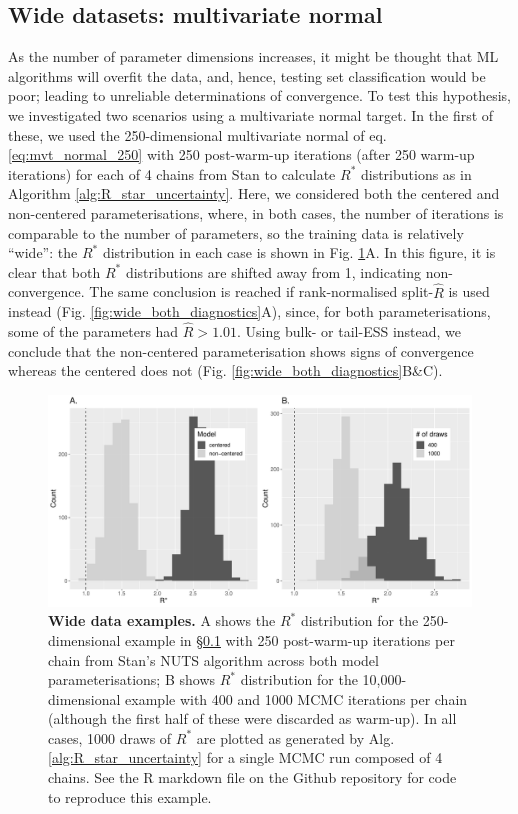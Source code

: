 \documentclass{article}
\begin{document}
\subsection{Wide datasets: multivariate normal}\label{sec:wide}
As the number of parameter dimensions increases, it might be thought that ML algorithms will overfit the data, and, hence, testing set classification would be poor; leading to unreliable determinations of convergence. To test this hypothesis, we investigated two scenarios using a multivariate normal target. In the first of these, we used the 250-dimensional multivariate normal of eq. \eqref{eq:mvt_normal_250} with 250 post-warm-up iterations (after 250 warm-up iterations) for each of 4 chains from Stan to calculate $R^*$ distributions as in Algorithm \ref{alg:R_star_uncertainty}. Here, we considered both the centered and non-centered parameterisations, where, in both cases, the number of iterations is comparable to the number of parameters, so the training data is relatively ``wide'': the $R^*$ distribution in each case is shown in Fig. \ref{fig:mvt_wide_both}A. In this figure, it is clear that both $R^*$ distributions are shifted away from 1, indicating non-convergence. The same conclusion is reached if rank-normalised split-$\widehat{R}$ is used instead (Fig. \ref{fig:wide_both_diagnostics}A), since, for both parameterisations, some of the parameters had $\widehat{R}>1.01$. Using bulk- or tail-ESS instead, we conclude that the non-centered parameterisation shows signs of convergence whereas the centered does not (Fig. \ref{fig:wide_both_diagnostics}B\&C). 

\begin{figure}[!htb]
	\centerline{\includegraphics[width=1\textwidth]{../output/mvt_wide_both.pdf}}
	\caption{\textbf{Wide data examples.} A shows the $R^*$ distribution for the 250-dimensional example in \S\ref{sec:wide} with 250 post-warm-up iterations per chain from Stan's NUTS algorithm across both model parameterisations; B shows $R^*$ distribution for the 10,000-dimensional example with 400 and 1000 MCMC iterations per chain (although the first half of these were discarded as warm-up). In all cases, 1000 draws of $R^*$ are plotted as generated by Alg. \ref{alg:R_star_uncertainty} for a single MCMC run composed of 4 chains. See the R markdown file on the Github repository for code to reproduce this example.}
	\label{fig:mvt_wide_both}
\end{figure}
\end{document}

